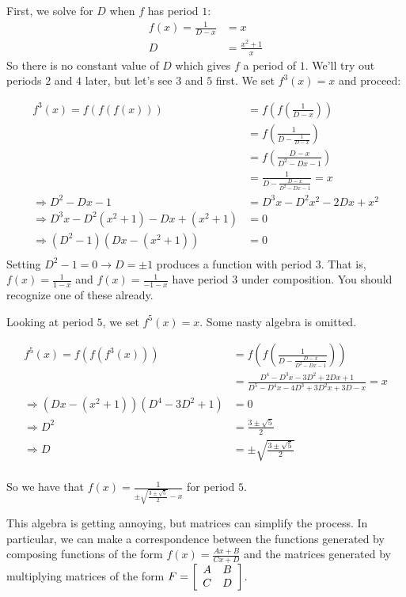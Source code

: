 \documentclass[../gatm.tex]{subfiles}
\begin{document}
First, we solve for $D$ when $f$ has period $1$:
\begin{align*}
f(x)=\frac{1}{D-x}&=x \\
D&=\frac{x^2+1}{x}
\end{align*}
So there is no constant value of $D$ which gives $f$ a period of $1$. We'll try out periods $2$ and $4$ later, but let's see $3$ and $5$ first. We set $f^3(x)=x$ and proceed:

\allowdisplaybreaks
\begin{align*}
f^3(x)=f(f(f(x)))&=f\left(f\left(\frac{1}{D-x}\right)\right) \\
&= f\left(\frac{1}{D-\frac{1}{D-x}}\right) \\
&= f\left(\frac{D-x}{D^2-Dx-1}\right) \\
&= \frac{1}{D-\frac{D-x}{D^2-Dx-1}} = x \\
\Longrightarrow D^2-Dx-1&=D^3x-D^2x^2-2Dx+x^2 \\
\Longrightarrow D^3x-D^2(x^2+1)-Dx+(x^2+1)&=0 \\
\Longrightarrow (D^2-1)(Dx-(x^2+1))&=0 \\
\end{align*}
Setting $D^2-1=0\rightarrow D=\pm 1$ produces a function with period $3$. That is, $f(x)=\frac{1}{1-x}$ and $f(x)=\frac{1}{-1-x}$ have period $3$ under composition. You should recognize one of these already.

Looking at period $5$, we set $f^5(x)=x$. Some nasty algebra is omitted.

\begin{align*}
f^5(x)=f(f(f^3(x)))&=f\left(f\left(\frac{1}{D-\frac{D-x}{D^2-Dx-1}}\right)\right) \\
&=\frac{D^4-D^3x-3D^2+2Dx+1}{D^5-D^4x-4D^3+3D^2x+3D-x}=x \\
\Longrightarrow (Dx-(x^2+1))(D^4-3D^2+1)&=0 \\
\Longrightarrow D^2&=\frac{3\pm\sqrt{5}}{2} \\
\Longrightarrow D &= \pm{\sqrt{\frac{3\pm\sqrt{5}}{2}}} \\
\end{align*}

So we have that $f(x)=\frac{1}{\pm\sqrt{\frac{3\pm\sqrt{5}}{2}}-x}$ for period $5$.

This algebra is getting annoying, but matrices can simplify the process. In particular, we can make a correspondence between the functions generated by composing functions of the form $f(x)=\frac{Ax+B}{Cx+D}$ and the matrices generated by multiplying matrices of the form $F=\left[\begin{array}{cc} A & B \\ C & D \end{array}\right]$.
\end{document}
